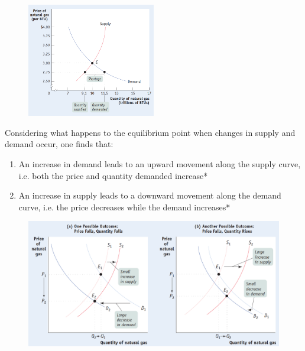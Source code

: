 \documentclass[english,course]{Notes}
\begin{document}
\begin{figure}[ht]
\centering
\includegraphics[width=0.5\textwidth]{supplyShortage}
\end{figure}

	\par{Considering what happens to the equilibrium point when changes in supply and demand occur, one finds that:}
	
	\begin{enumerate}
		\item An increase in demand leads to an upward movement along the supply curve, i.e. both the price and quantity demanded increase*~
		\item An increase in supply leads to a downward movement along the demand curve, i.e. the price decreases while the demand increases*
	\end{enumerate}
	

\begin{figure}[ht]
\centering
\includegraphics[width=\textwidth]{supplydemandEq}
\end{figure}
\end{document}
